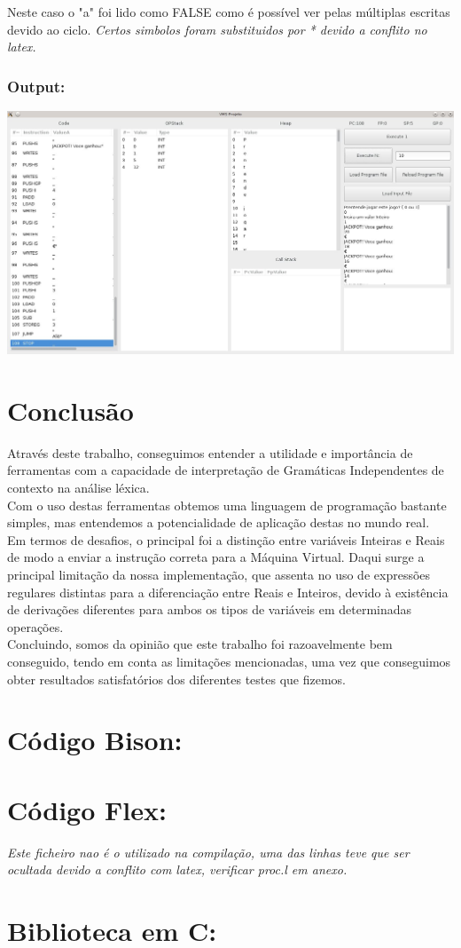 \documentclass{report}
\begin{document}
Neste caso o "a" foi lido como FALSE como é possível ver pelas múltiplas escritas devido ao ciclo.
\textit{Certos simbolos foram substituidos por * devido a conflito no latex.}
\subsection{Output:}

\includegraphics[width=\linewidth]{reads.jpg}

\chapter{Conclusão}
Através deste trabalho, conseguimos entender a utilidade e importância de ferramentas com a capacidade de interpretação de Gramáticas Independentes de contexto na análise léxica.\\
Com o uso destas ferramentas obtemos uma linguagem de programação bastante simples, mas entendemos a potencialidade de aplicação destas no mundo real.\\
Em termos de desafios, o principal foi a distinção entre variáveis Inteiras e Reais de modo a enviar a instrução correta para a Máquina Virtual. Daqui surge a principal limitação da nossa implementação, que assenta no uso de expressões regulares distintas para a diferenciação entre Reais e Inteiros, devido à existência de derivações diferentes para ambos os tipos de variáveis em determinadas operações.\\
Concluindo, somos da opinião que este trabalho foi razoavelmente bem conseguido, tendo em conta as limitações mencionadas, uma vez que conseguimos obter resultados satisfatórios dos diferentes testes que fizemos.

\appendix
\chapter{Código Bison:}
\chapter{Código Flex:}
\textit{Este ficheiro nao é o utilizado na compilação, uma das linhas teve que ser ocultada devido a conflito com latex, verificar proc.l em anexo.}
\chapter{Biblioteca em C:}
\end{document}
